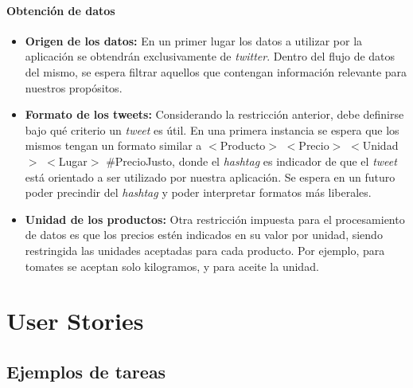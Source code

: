 \documentclass[10pt, a4paper]{article}
\newcommand{\userStory}[8]{
	\fbox{
	\begin{minipage}{0.9\textwidth}

		\vspace{0.1cm}

		\begin{large}\textbf{#1: \textit{#2}}		\end{large}

		\vspace{11pt}

		\textbf{Descripción:} #3

		\vspace{9pt}

		\textbf{Criterios de aceptación:} #4

		\vspace{9pt}

		\begin{tabular}{ l c l }
		\textbf{Story Points:} #5 & \hspace{0.2\textwidth} & \textbf{Responsable:} #6 \\[6pt]
		\textbf{Iteración:} #7 & \hspace{0.2\textwidth} & \textbf{Estado:} #8 \\
		\end{tabular}

		\vspace{2pt}

	\end{minipage}
	}
}
\newcommand{\task}[7]{
	\fbox{
	\begin{minipage}{0.9\textwidth}

		\vspace{0.1cm}

		\begin{large}\textbf{#1: }\textit{#2}		\end{large}

		\vspace{5pt}

		\textbf{Descripción:} #3

		\vspace{3pt}

		\begin{tabular}{ l c l }
		\textbf{Horas estimadas:} #4 & \hspace{0.2\textwidth} & \textbf{Responsable:} #5 \\[1pt]
		\textbf{Horas faltantes:} #6 & \hspace{0.2\textwidth} & \textbf{Estado:} #7 \\
		\end{tabular}

		\vspace{2pt}

	\end{minipage}
	}
}
\begin{document}
\paragraph{Obtención de datos}
\begin{itemize}
    \item \textbf{Origen de los datos:} En un primer lugar los datos a utilizar por la aplicación se obtendrán exclusivamente de \emph{twitter}. Dentro del flujo de datos del mismo, se espera filtrar aquellos que contengan información relevante para nuestros propósitos.
    \item \textbf{Formato de los tweets:} Considerando la restricción anterior, debe definirse bajo qué criterio un \emph{tweet} es útil. En una primera instancia se espera que los mismos tengan un formato similar a \textsf{$<$Producto$>$ $<$Precio$>$ $<$Unidad$>$ $<$Lugar$>$ \#PrecioJusto}, donde el \emph{hashtag} es indicador de que el \emph{tweet} está orientado a ser utilizado por nuestra aplicación. Se espera en un futuro poder precindir del \emph{hashtag} y poder interpretar formatos más liberales.
    \item \textbf{Unidad de los productos:} Otra restricción impuesta para el procesamiento de datos es que los precios estén indicados en su valor por unidad, siendo restringida las unidades aceptadas para cada producto. Por ejemplo, para tomates se aceptan solo kilogramos, y para aceite la unidad.
\end{itemize}

\section{User Stories}




\newpage

\subsection{Ejemplos de tareas}
\end{document}
